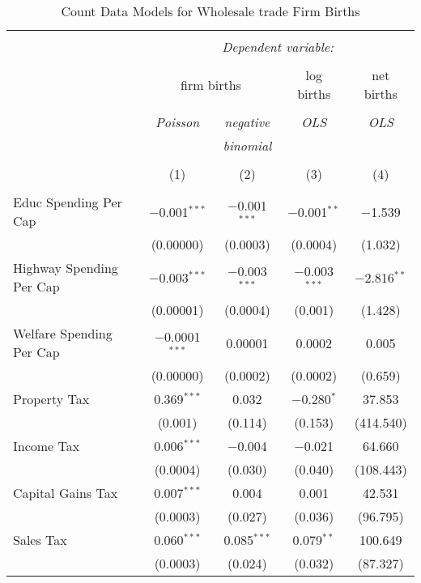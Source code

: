 
\begin{table}[!htbp] \centering 
  \caption{Count Data Models for Wholesale trade Firm Births} 
  \label{} 
\begin{tabular}{@{\extracolsep{5pt}}lcccc} 
\\[-1.8ex]\hline 
\hline \\[-1.8ex] 
 & \multicolumn{4}{c}{\textit{Dependent variable:}} \\ 
\cline{2-5} 
\\[-1.8ex] & \multicolumn{2}{c}{firm births} & log births & net births \\ 
\\[-1.8ex] & \textit{Poisson} & \textit{negative} & \textit{OLS} & \textit{OLS} \\ 
 & \textit{} & \textit{binomial} & \textit{} & \textit{} \\ 
\\[-1.8ex] & (1) & (2) & (3) & (4)\\ 
\hline \\[-1.8ex] 
 Educ Spending Per Cap & $-$0.001$^{***}$ & $-$0.001$^{***}$ & $-$0.001$^{**}$ & $-$1.539 \\ 
  & (0.00000) & (0.0003) & (0.0004) & (1.032) \\ 
  Highway Spending Per Cap  & $-$0.003$^{***}$ & $-$0.003$^{***}$ & $-$0.003$^{***}$ & $-$2.816$^{**}$ \\ 
  & (0.00001) & (0.0004) & (0.001) & (1.428) \\ 
  Welfare Spending Per Cap  & $-$0.0001$^{***}$ & 0.00001 & 0.0002 & 0.005 \\ 
  & (0.00000) & (0.0002) & (0.0002) & (0.659) \\ 
  Property Tax & 0.369$^{***}$ & 0.032 & $-$0.280$^{*}$ & 37.853 \\ 
  & (0.001) & (0.114) & (0.153) & (414.540) \\ 
  Income Tax & 0.006$^{***}$ & $-$0.004 & $-$0.021 & 64.660 \\ 
  & (0.0004) & (0.030) & (0.040) & (108.443) \\ 
  Capital Gains Tax & 0.007$^{***}$ & 0.004 & 0.001 & 42.531 \\ 
  & (0.0003) & (0.027) & (0.036) & (96.795) \\ 
  Sales Tax & 0.060$^{***}$ & 0.085$^{***}$ & 0.079$^{**}$ & 100.649 \\ 
  & (0.0003) & (0.024) & (0.032) & (87.327) \\ 

\end{tabular}
\end{table}
